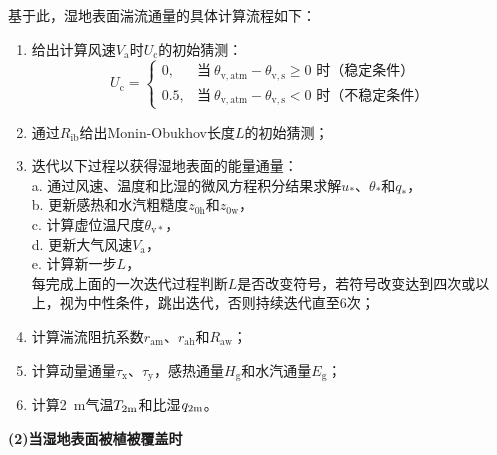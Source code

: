 基于此，湿地表面湍流通量的具体计算流程如下：
\begin{enumerate}
  \item 给出计算风速$V_{\mathrm {a}} $时$U_{\mathrm {c}} $的初始猜测：
    \begin{equation}
      U_{\mathrm {c}}  = \begin{cases}
        0, &\text{当}\ \theta_{\mathrm{v,atm}}-\theta_{\mathrm{v,s}} \geqslant 0 \text{ 时（稳定条件）} \\
        0.5, &\text{当}\ \theta_{\mathrm{v,atm}}-\theta_{\mathrm{v,s}} < 0 \text{ 时（不稳定条件）}
      \end{cases}
    \end{equation}
  \item 通过$R_{\mathrm{ib}}$给出Monin-Obukhov长度$L$的初始猜测；
  \item 迭代以下过程以获得湿地表面的能量通量：\\
    a. 通过风速、温度和比湿的微风方程积分结果求解$u_*$、$\theta_*$和$q_*$，\\
    b. 更新感热和水汽粗糙度$z_{\mathrm{0h}}$和$z_{\mathrm{0w}}$，\\
    c. 计算虚位温尺度$\theta_{\mathrm{v*}}$，\\
    d. 更新大气风速$V_{\mathrm {a}} $，\\
    e. 计算新一步$L$，\\
    每完成上面的一次迭代过程判断$L$是否改变符号，若符号改变达到四次或以上，视为中性条件，跳出迭代，否则持续迭代直至6次；
  \item 计算湍流阻抗系数$r_{\mathrm{am}}$、$r_{\mathrm{ah}}$和$R_{\mathrm{aw}}$；
  \item 计算动量通量$\tau_{\mathrm {x}} $、$\tau_{\mathrm {y}} $，感热通量$H_{\mathrm {g}} $和水汽通量$E_{\mathrm {g}} $；
  \item 计算\qty{2}{m}气温$T_{\rm 2m}$和比湿$q_{\rm 2m}$。
\end{enumerate}

\textbf {(2)当湿地表面被植被覆盖时}\\

